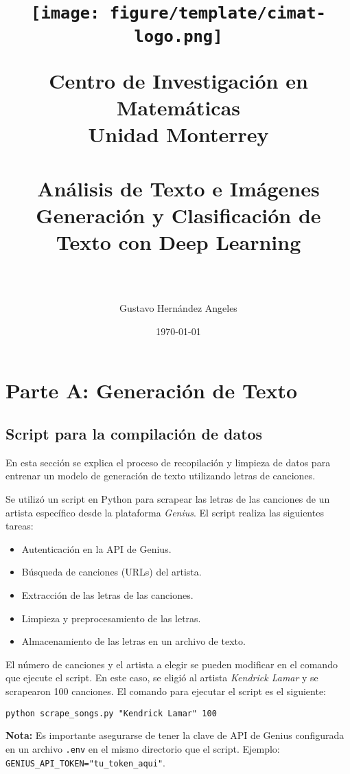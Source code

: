 \documentclass[paper=letter, fontsize=11pt, draft=false]{scrartcl}
\title{	
    \begin{center}
        \texttt{[image: figure/template/cimat-logo.png]} %
    \end{center}
    \vspace{0.5cm}
    \normalfont \normalsize 
    \textbf{\Large   Centro de Investigación en Matemáticas} \\
    \Large Unidad Monterrey \\ [25pt] 
    \horrule{1pt} \\[0.4cm] %
    \huge Análisis de Texto e Imágenes\\
    \Large Generación y Clasificación de Texto con Deep Learning\\ 
    \horrule{2pt} \\[0.5cm] %
}
\author{\large Gustavo Hernández Angeles}
\date{\normalsize\today} %
\numberwithin{equation}{section} %
\numberwithin{figure}{section} %
\numberwithin{table}{section} %
\numberwithin{subsection}{section}
\begin{document}
\maketitle %
\thispagestyle{empty}
\newpage

\tableofcontents
\newpage



\section{Parte A: Generación de Texto}

\subsection{Script para la compilación de datos}

En esta sección se explica el proceso de recopilación y limpieza de datos para entrenar un modelo de generación de texto utilizando letras de canciones. 

Se utilizó un script en Python para scrapear las letras de las canciones de un artista específico desde la plataforma \textit{Genius}. El script realiza las siguientes tareas:

\begin{itemize}
    \item Autenticación en la API de Genius.
    \item Búsqueda de canciones (URLs) del artista.
    \item Extracción de las letras de las canciones.
    \item Limpieza y preprocesamiento de las letras.
    \item Almacenamiento de las letras en un archivo de texto.
\end{itemize}

El número de canciones y el artista a elegir se pueden modificar en el comando que ejecute el script. En este caso, se eligió al artista \textit{Kendrick Lamar} y se scrapearon 100 canciones. El comando para ejecutar el script es el siguiente:

\begin{center}
\texttt{python scrape\_songs.py "Kendrick Lamar" 100}
\end{center}

\textbf{Nota:} Es importante asegurarse de tener la clave de API de Genius configurada en un archivo \texttt{.env} en el mismo directorio que el script. Ejemplo: \texttt{GENIUS\_API\_TOKEN="tu\_token\_aqui"}.
\end{document}
